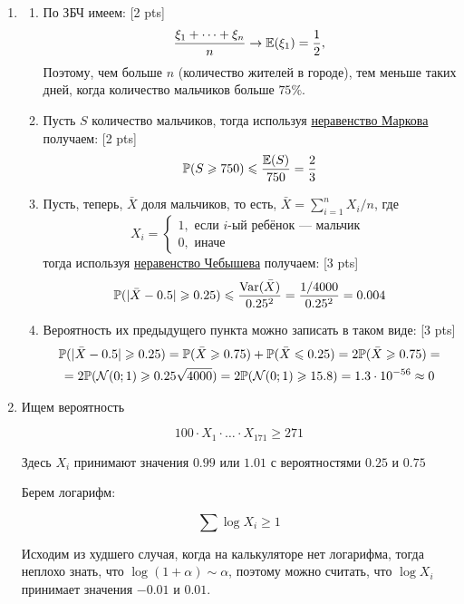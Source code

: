 \documentclass[12pt, a4paper]{article}\usepackage[]{graphicx}\usepackage[]{color}
\newcommand{\cN}{\mathcal{N}}
\begin{document}
\begin{enumerate}
					\item
					\begin{enumerate}
						\item По ЗБЧ имеем: [2 pts]
						\[
						\frac{\xi_1 + \dots + \xi_n}{n} \to \mathbb{E}(\xi_1) = \frac{1}{2},
						\]
						Поэтому, чем больше $n$ (количество жителей в городе), тем меньше таких дней, когда количество мальчиков больше $75\%.$ \\
						\item Пусть $S$ количество мальчиков, тогда используя \href{https://en.wikipedia.org/wiki/Markov%27s_inequality}{неравенство Маркова} получаем: [2 pts]
							\[
							\mathbb{P}(S \geqslant 750) \leqslant \frac{\mathbb{E}(S)}{750} = \frac{2}{3}
							\]
							\item Пусть, теперь, $\bar X$ доля мальчиков, то есть, $\bar X = \sum_{i=1}^n X_i /n$, где
							\[
							X_i =
							\begin{cases}
							1, \text{ если }i\text{-ый ребёнок — мальчик }\\
							0, \text{ иначе }
							\end{cases}
							\]
							тогда используя \href{https://en.wikipedia.org/wiki/Markov%27s_inequality}{неравенство Чебышева} получаем: [3 pts]
								\[
								\mathbb{P}(|\bar X - 0.5| \geqslant 0.25) \leqslant \frac{\operatorname{Var}(\bar X)}{0.25^2} = \frac{1/4000}{0.25^2} = 0.004
								\]
								\item Вероятность их предыдущего пункта можно записать в таком виде: [3 pts]
								\begin{multline}
								\P(|\bar X - 0.5| \ge 0.25) = \P(\bar X \ge 0.75) + \P(\bar X \le 0.25) = 2\P(\bar X \ge 0.75)=\\
								= 2\P(\cN(0;1)\geq 0.25\sqrt{4000})=2\P(\cN(0;1)\geq 15.8) = 1.3 \cdot 10^{-56} \approx 0
								\nonumber\end{multline}
							\end{enumerate}

							\item

							Ищем вероятность

							\[
							100\cdot X_1 \cdot \ldots \cdot X_{171} \geq 271
							\]

							Здесь $X_i$ принимают значения $0.99$ или $1.01$ с вероятностями $0.25$ и $0.75$

							Берем логарифм:

							\[
							\sum \log X_i \geq 1
							\]

							Исходим из худшего случая, когда на калькуляторе нет логарифма, тогда неплохо знать, что $\log (1+\alpha) \sim \alpha$, поэтому можно считать, что $\log X_i$ принимает значения $-0.01$ и $0.01$.


\end{enumerate}
\end{document}
